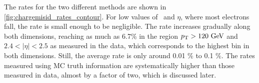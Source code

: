 The rates for the two different methods are 
shown in \fig\ref{fig:chargemisid_rates_contour}.
For low values of \pt~and $\eta$, where most electrons fall, 
the rate is small enough to be negligible. 
The rate increases gradually along both dimensions, reaching as much as
6.7\% in the region $\pt > 120\GeV$ and $2.4 < |\eta| < 2.5$ as measured
in the data, which corresponds to the highest bin in both dimensions. 
Still, the average rate is only around 0.01 \% to 0.1 \%.
The rates measured using MC truth information are systematically higher
than those measured in data, almost by a factor of two, which is discussed later.





